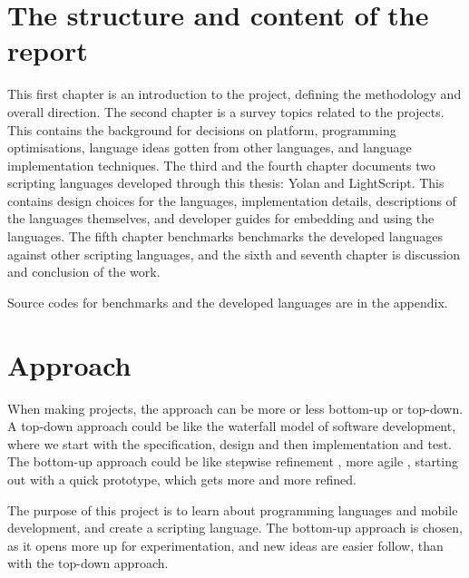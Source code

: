 \documentclass[11pt]{report}
\begin{document}
\begin{comment}
From a personal point of view, 
I would like to get started on development for mobile devices, 
and would also like to brush up on programming language implementation.
Design and implementation of a scripting language for mobile devices is spot on this topic.
\end{comment}


\section{The structure and content of the report}

This first chapter is an introduction to the project, defining the methodology and overall direction. 
The second chapter is a survey topics related to the projects. This contains the background for decisions on platform, programming optimisations, language ideas gotten from other languages, and language implementation techniques.
The third and the fourth chapter documents two scripting languages developed through this thesis: Yolan and LightScript. This contains design choices for the languages, implementation details, descriptions of the languages themselves, and developer guides for embedding and using the languages.
The fifth chapter benchmarks benchmarks the developed languages against other scripting languages,
and the sixth and seventh chapter is discussion and conclusion of the work.

Source codes for benchmarks and the developed languages are in the appendix.

\section{Approach}
\label{method}

When making projects, the approach can be
more or less bottom-up or top-down.
A top-down approach could be like the waterfall model \cite{waterfall} of software development,
where we start with the specification, design and then implementation and test.
The bottom-up approach could be like stepwise refinement \cite{stepwise-refinement}, more agile \cite{agile-manifesto, extreme-programming}, starting out with a quick prototype, which gets more and more refined.

The purpose of this project is to learn about programming languages and mobile development, and create a scripting language. 
The bottom-up approach is chosen, as it opens more up for experimentation, and new ideas are easier follow, than with the top-down approach.
\end{document}
